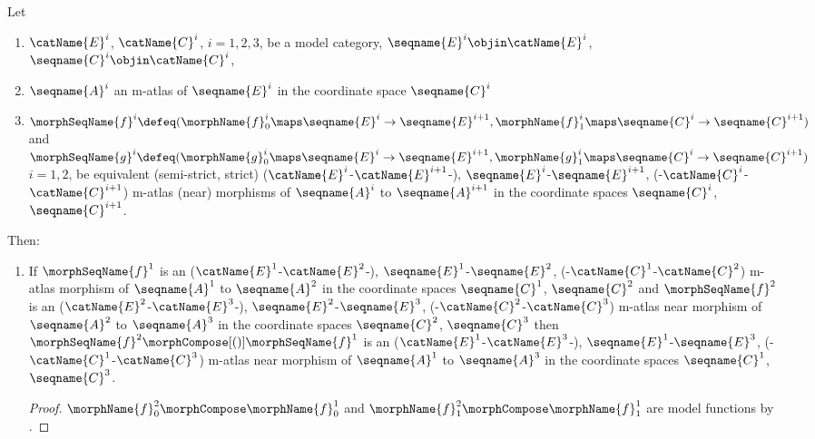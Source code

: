 \documentclass{article}
\begin{document}
\begin{lemma}
\label{lem:M-ATLmorphcomp}
Let
\begin{enumerate}
\item
$\catName{E}^i$, $\catName{C}^i$, $i=1,2,3$, be a model category,
$\seqname{E}^i \objin \catName{E}^i$,
$\seqname{C}^i \objin \catName{C}^i$,
\item
$\seqname{A}^i$ an m-atlas of
$\seqname{E}^i$ in the coordinate space $\seqname{C}^i$
\item
$
  \morphSeqName{f}^i \defeq
  (
    \morphName{f}^i_0 \maps \seqname{E}^i \to \seqname{E}^{i+1},
    \morphName{f}^i_1 \maps \seqname{C}^i \to \seqname{C}^{i+1}
  )
$
and
$
  \morphSeqName{g}^i \defeq
  (
    \morphName{g}^i_0 \maps \seqname{E}^i \to \seqname{E}^{i+1},
    \morphName{g}^i_1 \maps \seqname{C}^i \to \seqname{C}^{i+1}
  )
$
$i=1,2$,
be equivalent (semi-strict, strict)
\nobreaks
  {
    {($\catName{E}^i$-$\catName{E}^{i+1}$-)},
    {$\seqname{E}^i$-$\seqname{E}^{i+1}$},
    {(-$\catName{C}^i$-$\catName{C}^{i+1}$)}
  }
m-atlas (near) morphisms of $\seqname{A}^i$ to $\seqname{A}^{i+1}$ in
the coordinate spaces $\seqname{C}^i$, $\seqname{C}^{i+1}$.
\end{enumerate}

Then:
\begin{enumerate}
\item
\label{M-morphcomp:nearcompmorph}
If $\morphSeqName{f}^1$ is an
\nobreaks
  {
    {($\catName{E}^1$-$\catName{E}^2$-)},
    {$\seqname{E}^1$-$\seqname{E}^2$},
    {(-$\catName{C}^1$-$\catName{C}^2$)}
  }
m-atlas morphism of $\seqname{A}^1$ to $\seqname{A}^2$ in the
coordinate spaces $\seqname{C}^1$, $\seqname{C}^2$ and
$\morphSeqName{f}^2$ is an
\nobreaks
  {
    {($\catName{E}^2$-$\catName{E}^3$-)},
    {$\seqname{E}^2$-$\seqname{E}^3$},
    {(-$\catName{C}^2$-$\catName{C}^3$)}
  }
m-atlas near morphism of $\seqname{A}^2$ to $\seqname{A}^3$ in the
coordinate spaces $\seqname{C}^2$, $\seqname{C}^3$ then
$\morphSeqName{f}^2 \morphCompose[()] \morphSeqName{f}^1$ is an
\nobreaks
  {
    {($\catName{E}^1$-$\catName{E}^3$-)},
    {$\seqname{E}^1$-$\seqname{E}^3$},
    {(-$\catName{C}^1$-$\catName{C}^3$)}
  }
m-atlas near morphism of $\seqname{A}^1$
to $\seqname{A}^3$ in the coordinate spaces $\seqname{C}^1$,
$\seqname{C}^3$.

\begin{proof}
$\morphName{f}^2_0 \morphCompose \morphName{f}^1_0$ and
$\morphName{f}^2_1 \morphCompose \morphName{f}^1_1$ are model functions by
.


\end{proof}
\end{enumerate}
\end{lemma}
\end{document}
